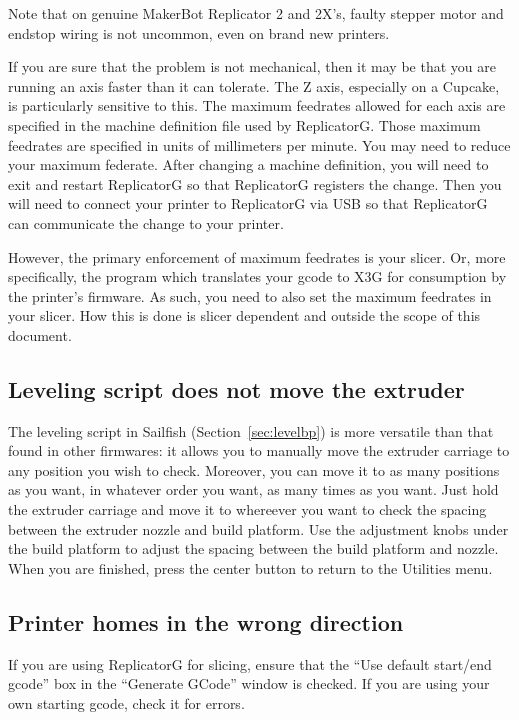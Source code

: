 Note that on genuine MakerBot Replicator 2 and 2X's, faulty stepper motor
and endstop wiring is not uncommon, even on brand new printers.

If you are sure that the problem is not mechanical, then it may be
that you are running an axis faster than it can tolerate.  The Z axis,
especially on a Cupcake, is particularly sensitive to this.  The
maximum feedrates allowed for each axis are specified in the machine
definition file used by ReplicatorG.  Those maximum feedrates are
specified in units of millimeters per minute.  You may need to reduce
your maximum federate.  After changing a machine definition, you will need to exit and
restart ReplicatorG so that ReplicatorG registers the change.  Then you
will need to connect your printer to ReplicatorG via USB so that
ReplicatorG can communicate the change to your printer.

However, the primary enforcement of maximum feedrates is your slicer.  Or,
more specifically, the program which translates your gcode to \gls{X3G} for
consumption by the printer's firmware.  As such, you need to also set
the maximum feedrates in your slicer.  How this is done is slicer dependent
and outside the scope of this document.

\subsection{Leveling script does not move the extruder}

The leveling script in Sailfish (Section~\ref{sec:levelbp}) is more
versatile than that found in other firmwares: it allows you to manually
move the extruder carriage to any position you wish to check.  Moreover,
you can move it to as many positions as you want, in whatever order you
want, as many times as you want.  Just hold the extruder carriage and move
it to whereever you want to check the spacing between the extruder nozzle
and build platform.  Use the adjustment knobs under the build platform
to adjust the spacing between the build platform and nozzle.  When you are
finished, press the center button to return to the Utilities menu.

\subsection{Printer homes in the wrong direction}

If you are using ReplicatorG for slicing, ensure that the ``Use default
start/end gcode'' box in the ``Generate GCode'' window is checked. If you
are using your own starting gcode, check it for errors.

